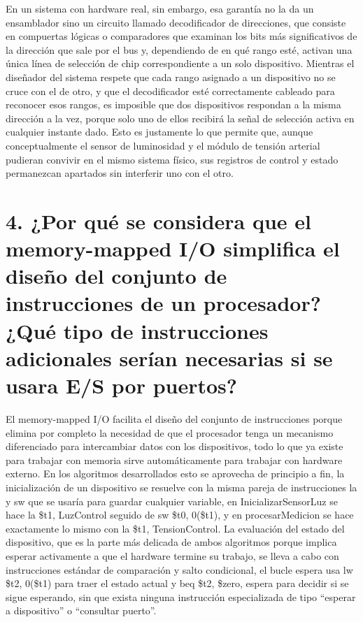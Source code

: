 \documentclass[12pt, letterpaper]{article}
\begin{document}
En un sistema con hardware real, sin embargo, esa garantía no la da un ensamblador sino un circuito llamado decodificador de direcciones, que consiste en compuertas lógicas o comparadores que examinan los bits más significativos de la dirección que sale por el bus y, dependiendo de en qué rango esté, activan una única línea de selección de chip correspondiente a un solo dispositivo. Mientras el diseñador del sistema respete que cada rango asignado a un dispositivo no se cruce con el de otro, y que el decodificador esté correctamente cableado para reconocer esos rangos, es imposible que dos dispositivos respondan a la misma dirección a la vez, porque solo uno de ellos recibirá la señal de selección activa en cualquier instante dado. Esto es justamente lo que permite que, aunque conceptualmente el sensor de luminosidad y el módulo de tensión arterial pudieran convivir en el mismo sistema físico, sus registros de control y estado permanezcan apartados sin interferir uno con el otro.\newpage

\section*{\textbf{4. ¿Por qué se considera que el memory-mapped I/O simplifica el diseño del conjunto de instrucciones de un procesador? ¿Qué tipo de instrucciones adicionales serían necesarias si se usara E/S por puertos?}}

El memory-mapped I/O facilita el diseño del conjunto de instrucciones porque elimina por completo la necesidad de que el procesador tenga un mecanismo diferenciado para intercambiar datos con los dispositivos, todo lo que ya existe para trabajar con memoria sirve automáticamente para trabajar con hardware externo. En los algoritmos desarrollados esto se aprovecha de principio a fin, la inicialización de un dispositivo se resuelve con la misma pareja de instrucciones la y sw que se usaría para guardar cualquier variable, en InicializarSensorLuz se hace la \$t1, LuzControl seguido de sw \$t0, 0(\$t1), y en procesarMedicion se hace exactamente lo mismo con la \$t1, TensionControl. La evaluación del estado del dispositivo, que es la parte más delicada de ambos algoritmos porque implica esperar activamente a que el hardware termine su trabajo, se lleva a cabo con instrucciones estándar de comparación y salto condicional, el bucle espera usa lw \$t2, 0(\$t1) para traer el estado actual y beq \$t2, \$zero, espera para decidir si se sigue esperando, sin que exista ninguna instrucción especializada de tipo ``esperar a dispositivo'' o ``consultar puerto''.
\end{document}
